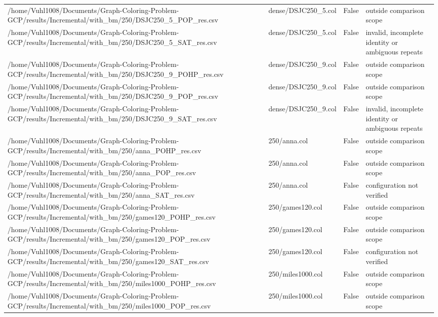 \begin{table}[htbp]
\begin{tabular}{llll}
/home/Vuhl1008/Documents/Graph-Coloring-Problem-GCP/results/Incremental/with\_bm/250/DSJC250\_5\_POP\_res.csv & dense/DSJC250\_5.col & False & outside comparison scope \\
/home/Vuhl1008/Documents/Graph-Coloring-Problem-GCP/results/Incremental/with\_bm/250/DSJC250\_5\_SAT\_res.csv & dense/DSJC250\_5.col & False & invalid, incomplete identity or ambiguous repeats \\
/home/Vuhl1008/Documents/Graph-Coloring-Problem-GCP/results/Incremental/with\_bm/250/DSJC250\_9\_POHP\_res.csv & dense/DSJC250\_9.col & False & outside comparison scope \\
/home/Vuhl1008/Documents/Graph-Coloring-Problem-GCP/results/Incremental/with\_bm/250/DSJC250\_9\_POP\_res.csv & dense/DSJC250\_9.col & False & outside comparison scope \\
/home/Vuhl1008/Documents/Graph-Coloring-Problem-GCP/results/Incremental/with\_bm/250/DSJC250\_9\_SAT\_res.csv & dense/DSJC250\_9.col & False & invalid, incomplete identity or ambiguous repeats \\
/home/Vuhl1008/Documents/Graph-Coloring-Problem-GCP/results/Incremental/with\_bm/250/anna\_POHP\_res.csv & 250/anna.col & False & outside comparison scope \\
/home/Vuhl1008/Documents/Graph-Coloring-Problem-GCP/results/Incremental/with\_bm/250/anna\_POP\_res.csv & 250/anna.col & False & outside comparison scope \\
/home/Vuhl1008/Documents/Graph-Coloring-Problem-GCP/results/Incremental/with\_bm/250/anna\_SAT\_res.csv & 250/anna.col & False & configuration not verified \\
/home/Vuhl1008/Documents/Graph-Coloring-Problem-GCP/results/Incremental/with\_bm/250/games120\_POHP\_res.csv & 250/games120.col & False & outside comparison scope \\
/home/Vuhl1008/Documents/Graph-Coloring-Problem-GCP/results/Incremental/with\_bm/250/games120\_POP\_res.csv & 250/games120.col & False & outside comparison scope \\
/home/Vuhl1008/Documents/Graph-Coloring-Problem-GCP/results/Incremental/with\_bm/250/games120\_SAT\_res.csv & 250/games120.col & False & configuration not verified \\
/home/Vuhl1008/Documents/Graph-Coloring-Problem-GCP/results/Incremental/with\_bm/250/miles1000\_POHP\_res.csv & 250/miles1000.col & False & outside comparison scope \\
/home/Vuhl1008/Documents/Graph-Coloring-Problem-GCP/results/Incremental/with\_bm/250/miles1000\_POP\_res.csv & 250/miles1000.col & False & outside comparison scope \\

\end{tabular}
\end{table}
